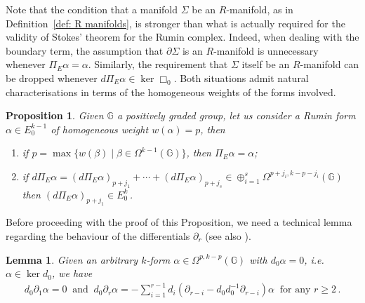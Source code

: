 \documentclass[dvipsnames]{amsart}
\newtheorem{lemma}[theorem]{Lemma}
\newtheorem{proposition}[theorem]{Proposition}
\theoremstyle{definition}
\theoremstyle{definition}
\numberwithin{equation}{section}
\newcommand{\G}{\mathbb{G}}
\begin{document}
Note that the condition that a manifold $\Sigma$ be an $R$-manifold, as in Definition~\ref{def: R manifolds}, is stronger than what is actually required for the validity of Stokes' theorem for the Rumin complex. Indeed, when dealing with the boundary term, the assumption that $\partial\Sigma$ is an $R$-manifold is unnecessary whenever $\Pi_E\alpha=\alpha$. Similarly, the requirement that $\Sigma$ itself be an $R$-manifold can be dropped whenever $d\Pi_E\alpha\in\ker\Box_0$.
Both situations admit natural characterisations in terms of the homogeneous weights of the forms involved.
\begin{proposition}\label{prop: when R manifold is not needed}
    Given $\G$ a positively graded group, let us consider a Rumin form $\alpha\in E_0^{k-1}$ of homogeneous weight $w(\alpha)=p$, then
    \begin{enumerate}
        \item if $p=\max \{w(\beta)\mid \beta\in\Omega^{k-1}(\G)\}$, then $\Pi_E\alpha=\alpha$;
        \item if $d\Pi_E\alpha=(d\Pi_E\alpha)_{p+j_1}+\cdots+(d\Pi_E\alpha)_{p+j_s}\in\oplus_{i=1}^s\Omega^{p+j_i,k-p-j_i}(\G)$ then $\left(d\Pi_E\alpha\right)_{p+j_1}\in E_0^k$\,.
    \end{enumerate}
\end{proposition}
Before proceeding with the proof of this Proposition, we need a technical lemma regarding the behaviour of the differentials $\partial_r$ (see also \cite[Lemma 3.3]{tripaldi2026spectralcomplexestruncatedmulticomplexes}).
\begin{lemma}\label{lem: d_0 of partial_r}
    Given an arbitrary $k$-form $\alpha\in\Omega^{p,k-p}(\G)$ with $d_0\alpha=0$, i.e. $\alpha\in\ker d_0$, we have
    \begin{align*}
        d_0\partial_1\alpha=0\ \text{ and }\ d_0\partial_r\alpha=-\sum_{i=1}^{r-1}d_i\left(\partial_{r-i}-d_0d_0^{-1}\partial_{r-i}\right)\alpha\ \text{ for any }r\ge 2\,.
    \end{align*}
\end{lemma}
\end{document}
